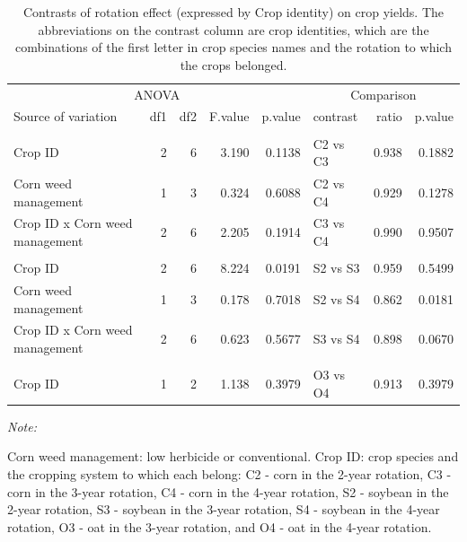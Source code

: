\documentclass[
]{article}
\begin{document}
\begin{table}

\caption{\label{tab:crop-jt-ct}Contrasts of rotation effect (expressed by Crop identity) on crop yields. The abbreviations on the contrast column are crop identities, which are the combinations of the first letter in crop species names and the rotation to which the crops belonged.}
\centering
\begin{threeparttable}
\begin{tabular}[t]{lrrr>{}r|lrr}
\toprule
\multicolumn{5}{c}{ANOVA} & \multicolumn{3}{c}{Comparison} \\
\cmidrule(l{3pt}r{3pt}){1-5} \cmidrule(l{3pt}r{3pt}){6-8}
Source of variation & df1 & df2 & F.value & p.value & contrast & ratio & p.value\\
\midrule
\addlinespace[0.3em]
\multicolumn{8}{l}{\textbf{(A) - Corn}}\\
\hspace{1em}Crop ID & 2 & 6 & 3.190 & 0.1138 & C2 vs C3 & 0.938 & 0.1882\\
\hspace{1em}Corn weed management & 1 & 3 & 0.324 & 0.6088 & C2 vs C4 & 0.929 & 0.1278\\
\hspace{1em}Crop ID x Corn weed management & 2 & 6 & 2.205 & 0.1914 & C3 vs C4 & 0.990 & 0.9507\\
\addlinespace[0.3em]
\multicolumn{8}{l}{\textbf{(B) - Soybean}}\\
\hspace{1em}Crop ID & 2 & 6 & 8.224 & 0.0191 & S2 vs S3 & 0.959 & 0.5499\\
\hspace{1em}Corn weed management & 1 & 3 & 0.178 & 0.7018 & S2 vs S4 & 0.862 & 0.0181\\
\hspace{1em}Crop ID x Corn weed management & 2 & 6 & 0.623 & 0.5677 & S3 vs S4 & 0.898 & 0.0670\\
\addlinespace[0.3em]
\multicolumn{8}{l}{\textbf{(C) - Oat}}\\
\hspace{1em}Crop ID & 1 & 2 & 1.138 & 0.3979 & O3 vs O4 & 0.913 & 0.3979\\
\bottomrule
\end{tabular}
\begin{tablenotes}[para]
\item \textit{Note: } 
\item Corn weed management: low herbicide or conventional. Crop ID: crop species and the cropping system to which each belong: C2 - corn in the 2-year rotation, C3 - corn in the 3-year rotation, C4 - corn in the 4-year rotation, S2 - soybean in the 2-year rotation, S3 - soybean in the 3-year rotation, S4 - soybean in the 4-year rotation, O3 - oat in the 3-year rotation, and O4 - oat in the 4-year rotation.
\end{tablenotes}
\end{threeparttable}
\end{table}
\end{document}
